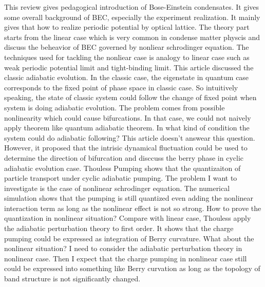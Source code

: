 \documentclass[fontsize=11pt, %
                             paper=a4, %
                             twoside, %
                             captions=tableheading,
                             index=totoc,
                             hyperref]{labbook}
\begin{document}
\begin{addmargin}[4cm]{0cm} %

\pagestyle{scrheadings} %

This review gives pedagogical introduction of Bose-Einstein condensates. It gives some overall background of BEC, especially the experiment realization. It mainly gives that how to realize periodic potential by optical lattice. The theory part starts from the linear case which is very common in condense matter physcis and discuss the beheavior of BEC governed by nonliear schrodinger equation. The techniques used for tackling the nonliear case is analogy to linear case such as weak periodic potential limit and tight-binding limit.
This article discussed the classic adiabatic evolution. In the classic case, the eigenstate in quantum case corresponds to the fixed point of phase space in classic case. So intuitively speaking, the state of classic system could follow the change of fixed point when system is doing adiabatic evolution. The problem comes from possible nonlinearity which could cause bifurcations. In that case, we could not naively apply theorem like quantum adiabatic theorem. In what kind of condition the system could do adiabatic following? This article doesn't answear this question. However, it proposed that the intrisic dynamical fluctuation could be used to determine the direction of bifurcation and disccuss the berry phase in cyclic adiabatic evolution case.
Thouless Pumping shows that the quantizaiton of particle transport  under cyclic adiabatic pumping. The problem I want to investigate is the case of nonlinear schrodinger equation. The numerical simulation shows that the pumping is still quantized even adding the nonlinear interaction term as long as the nonlinear effect is not so strong. How to prove the quantization in nonlinear situation? Compare with linear case, Thouless apply the adiabatic perturbation theory to first order. It shows that the charge pumping could be expressed as integration of Berry curvature. What about the nonlinear situation? I need to consider the adiabatic perturbation theory in nonlinear case. Then I expect that the charge pumping in nonlinear case still could be expressed into something like Berry curvation as long as the topology of band structure is not significantly changed.\\

\end{addmargin}
\end{document}
